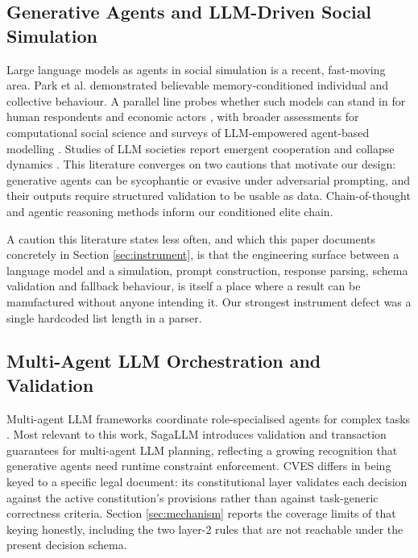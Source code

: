 \documentclass{ieeeaccess}
\begin{document}
\subsection{Generative Agents and LLM-Driven Social Simulation}
Large language models as agents in social simulation is a recent,
fast-moving area. Park et al. \cite{park2023generative,park2022social}
demonstrated believable memory-conditioned individual and collective
behaviour. A parallel line probes whether such models can stand in for
human respondents and economic actors \cite{argyle2023out,horton2023large,
aher2023using}, with broader assessments for computational social
science \cite{ziems2024can} and surveys of LLM-empowered agent-based
modelling \cite{gao2024large,xi2023rise,wang2024survey}. Studies of LLM
societies report emergent cooperation and collapse dynamics
\cite{piatti2024cooperate,li2023camel,chen2024agentverse}. This
literature converges on two cautions that motivate our design: generative
agents can be sycophantic or evasive under adversarial prompting, and
their outputs require structured validation to be usable as data.
Chain-of-thought and agentic reasoning methods \cite{yao2023react,
wei2022chain,shinn2023reflexion} inform our conditioned elite chain.

A caution this literature states less often, and which this paper
documents concretely in Section \ref{sec:instrument}, is that the
engineering surface between a language model and a simulation, prompt
construction, response parsing, schema validation and fallback
behaviour, is itself a place where a result can be manufactured without
anyone intending it. Our strongest instrument defect was a single
hardcoded list length in a parser.

\subsection{Multi-Agent LLM Orchestration and Validation}
Multi-agent LLM frameworks coordinate role-specialised agents for
complex tasks \cite{hong2024metagpt,wu2023autogen,guo2024large}. Most
relevant to this work, SagaLLM \cite{sagallm2025} introduces validation
and transaction guarantees for multi-agent LLM planning, reflecting a
growing recognition that generative agents need runtime constraint
enforcement. CVES differs in being keyed to a specific legal document:
its constitutional layer validates each decision against the active
constitution's provisions rather than against task-generic correctness
criteria. Section \ref{sec:mechanism} reports the coverage limits of
that keying honestly, including the two layer-2 rules that are not
reachable under the present decision schema.
\end{document}
